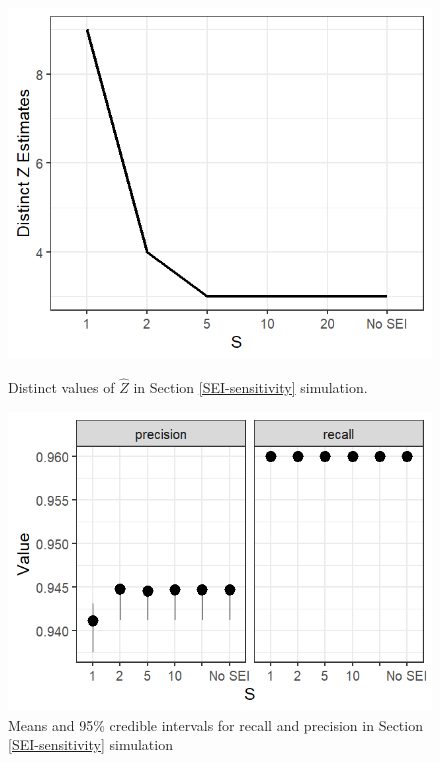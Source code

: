 \documentclass[ba]{imsart}
\begin{document}
\begin{figure}
	\begin{minipage}[c]{0.4\linewidth}
		\begin{center}
		\includegraphics[width=\linewidth]{../SEI_sensitivity/Z_plot}
		\caption{Distinct values of $\hat{Z}$ in Section \ref{SEI-sensitivity} simulation.}
		\label{fig:SEI_Z}
		\end{center}
	\end{minipage}
	\hfill
	\begin{minipage}[c]{0.5\linewidth}
		\begin{center}
		\includegraphics[width=\linewidth]{../SEI_sensitivity/eval_plot} 
		\caption{Means and 95\% credible intervals for recall and precision in Section \ref{SEI-sensitivity} simulation}
		\label{fig:SEI_eval}
	\end{center}
	\end{minipage}%
\end{figure}
\end{document}
